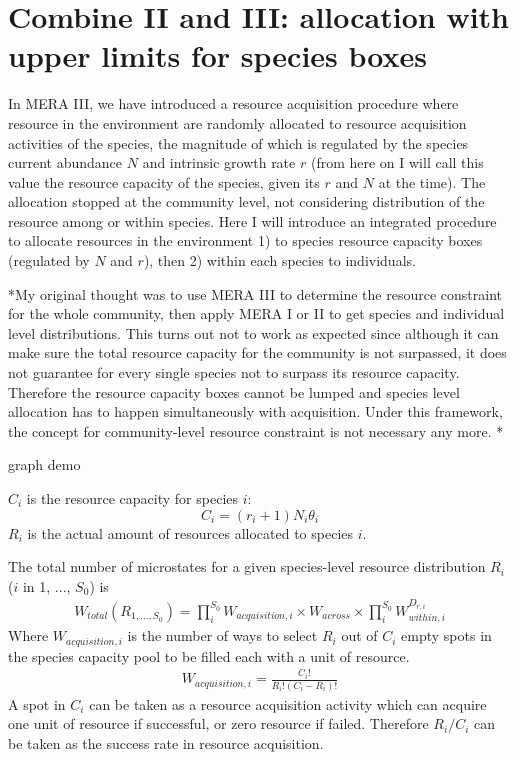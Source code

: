 \documentclass[12pt]{article}
\begin{document}
\section{Combine II and III: allocation with upper limits for species boxes}
In MERA III, we have introduced a resource acquisition procedure where resource in the environment are randomly allocated to resource acquisition activities of the species, the magnitude of which is regulated by the species current abundance $N$ and intrinsic growth rate $r$ (from here on I will call this value the resource capacity of the species, given its $r$ and $N$ at the time). The allocation stopped at the community level, not considering distribution of the resource among or within species. Here I will introduce an integrated procedure to allocate resources in the environment 1) to species resource capacity boxes (regulated by $N$ and $r$), then 2) within each species to individuals. 

*My original thought was to use MERA III to determine the resource constraint for the whole community, then apply MERA I or II to get species and individual level distributions. This turns out not to work as expected since although it can make sure the total resource capacity for the community is not surpassed, it does not guarantee for every single species not to surpass its resource capacity. Therefore the resource capacity boxes cannot be lumped  and species level allocation has to happen simultaneously with acquisition. Under this framework, the concept for community-level resource constraint is not necessary any more. *

graph demo

$C_i$ is the resource capacity for species $i$:
 \begin{equation}
C_i = (r_i+1)N_i \theta_i
\end{equation}
$R_i$ is the actual amount of resources allocated to species $i$. 

The total number of microstates for a given species-level resource distribution $R_i$ ($i$ in 1, ..., $S_0$) is
 \begin{equation}
 \begin{split}
W_{total}(R_{1,..., S_0})  =  \prod_i^{S_0}W_{acquisition,i} \times W_{across} \times\prod_i^{S_0}W_{within,i} ^{D_{r,i}}
\end{split}
\end{equation}
Where $W_{acquisition,i}$ is the number of ways to select $R_i$ out of $C_i$ empty spots in the species capacity pool to be filled each with a unit of resource. 
 \begin{equation}
 \begin{split}
W_{acquisition,i} = \frac{C_i!}{R_i! (C_i-R_i)!}
\end{split}
\end{equation}
A spot in $C_i$ can be taken as a resource acquisition activity which can acquire one unit of resource if successful, or zero resource if failed. Therefore $R_i/C_i$ can be taken as the success rate in resource acquisition. 
\end{document}
